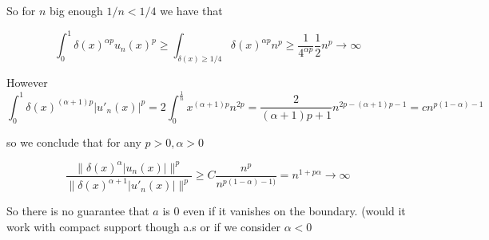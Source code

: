 So for $n$ big enough $1/n<1/4$ we have that 

$$\int_0^1 \delta(x)^{\alpha p} u_n(x) ^p \geq \int_{\delta(x)\geq 1/4} \delta(x)^{\alpha p}n^p \geq \frac{1}{4^{\alpha p}}\frac{1}{2}n^p\to \infty$$

However $$\int_0^1 \delta(x)^{(\alpha+1) p} |u'_n(x)| ^p = 2\int_0^{\frac{1}{n}} x^{(\alpha+1)p} n^{2p} =\frac{2}{(\alpha+1)p+1}n^{2p-(\alpha+1)p-1} =c n^{p(1-\alpha )-1} $$


so we conclude that for any $p>0, \alpha>0$ 

$$\frac{\|\delta(x)^\alpha |u_n(x)|\|^p}{\|\delta(x)^{\alpha+1} |u'_n(x)|\|^p}\geq C \frac{n^p}{n^{p(1-\alpha)-1)}}=n^{1+p\alpha}  \to \infty$$

So there is no guarantee that $a$ is 0 even if it vanishes on the boundary. (would it work with compact support though a.s or if we consider $\alpha< 0$

